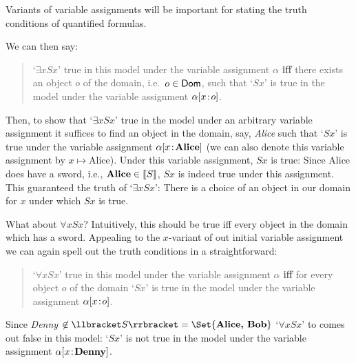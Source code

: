 Variants of variable assignments will be important for stating the truth conditions of quantified formulas.

We can then say:
\begin{quote}
`$\exists x Sx$' true in this model under the variable assignment $\alpha$ \textbf{iff} there exists an object $o$ of the domain, i.e.~$o\in \mathsf{Dom}$, such that `$Sx$' is true in the model under the variable assignment $\alpha[x \!:\! o]$.
\end{quote}
Then, to show that `$\exists x Sx$' true in the model under an arbitrary variable assignment it suffices to find an object in the domain, say, \emph{Alice} such that `$Sx$' is true under the variable assignment $\alpha[x \!:\! \text{\textbf{Alice}}]$  (we can also denote this variable assignment by $x\mapsto \text{Alice}$). Under this variable assignment, $Sx$ is true: Since Alice does have a sword, i.e., $\text{\textbf{Alice}}\in\llbracket S\rrbracket$, $Sx$ is indeed true under this assignment. This guaranteed the truth of `$\exists x Sx$': There is a choice of an object in our domain for $x$ under which $Sx$ is true.

What about $\forall x Sx$? Intuitively, this should be true iff every object in the domain which has a sword. Appealing to the $x$-variant of out initial variable assignment we can again spell out the truth conditions in a straightforward:
\begin{quote}
`$\forall x Sx$' true in this model under the variable assignment $\alpha$ \textbf{iff} for every object $o$ of the domain `$Sx$' is true in the model under the variable assignment $\alpha[x \!:\! o]$.
\end{quote}
 Since \emph{Denny} $\not\in\denote{S}=\Set{\text{\emph{Alice, Bob}}}$ `$\forall x Sx$' to comes out false in this model: `$Sx$' is not true in the model under the variable assignment $\alpha[x \!:\! \textbf{Denny}]$. 

